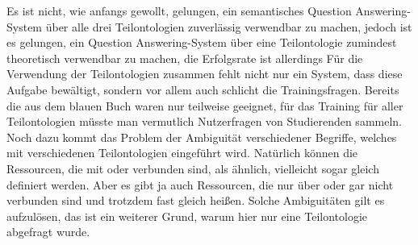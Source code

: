 Es ist nicht, wie anfangs gewollt, gelungen, ein semantisches Question Answering-System über alle drei Teilontologien zuverlässig verwendbar zu machen,
jedoch ist es gelungen, ein Question Answering-System über eine Teilontologie zumindest theoretisch verwendbar zu machen, die Erfolgsrate ist allerdings 
Für die Verwendung der Teilontologien zusammen fehlt nicht nur ein System, dass diese Aufgabe bewältigt, sondern vor allem auch schlicht die Trainingsfragen.
Bereits die aus dem blauen Buch waren nur teilweise geeignet, für das Training für aller Teilontologien müsste man vermutlich Nutzerfragen von Studierenden sammeln.
Noch dazu kommt das Problem der Ambiguität verschiedener Begriffe, welches mit verschiedenen Teilontologien eingeführt wird.
Natürlich können die Ressourcen, die mit  oder  verbunden sind, als ähnlich, vielleicht sogar gleich definiert werden.
Aber es gibt ja auch Ressourcen, die nur über  oder gar nicht verbunden sind und trotzdem fast gleich heißen.
Solche Ambiguitäten gilt es aufzulösen, das ist ein weiterer Grund, warum hier nur eine Teilontologie abgefragt wurde.
